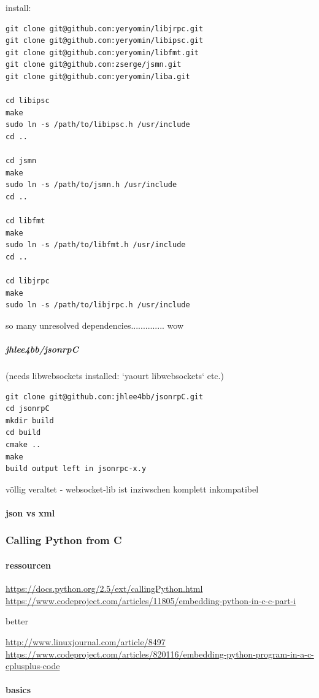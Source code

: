\documentclass[a4paper,10pt]{article}
\begin{document}
install:

\begin{lstlisting}
git clone git@github.com:yeryomin/libjrpc.git
git clone git@github.com:yeryomin/libipsc.git
git clone git@github.com:yeryomin/libfmt.git
git clone git@github.com:zserge/jsmn.git
git clone git@github.com:yeryomin/liba.git

cd libipsc
make
sudo ln -s /path/to/libipsc.h /usr/include
cd ..

cd jsmn
make
sudo ln -s /path/to/jsmn.h /usr/include
cd ..

cd libfmt
make
sudo ln -s /path/to/libfmt.h /usr/include
cd ..

cd libjrpc
make
sudo ln -s /path/to/libjrpc.h /usr/include
\end{lstlisting}

so many unresolved dependencies.............. wow

\subparagraph{jhlee4bb/jsonrpC}

(needs libwebsockets installed: `yaourt libwebsockets` etc.)

\begin{lstlisting}
git clone git@github.com:jhlee4bb/jsonrpC.git
cd jsonrpC
mkdir build
cd build
cmake ..
make
build output left in jsonrpc-x.y
\end{lstlisting}

völlig veraltet - websocket-lib ist inziwschen komplett inkompatibel

\paragraph{json vs xml}

\subsubsection{Calling Python from C}

\paragraph{ressourcen}

\url{https://docs.python.org/2.5/ext/callingPython.html}
\url{https://www.codeproject.com/articles/11805/embedding-python-in-c-c-part-i}

better

\url{http://www.linuxjournal.com/article/8497}
\url{https://www.codeproject.com/articles/820116/embedding-python-program-in-a-c-cplusplus-code}

\paragraph{basics}
\end{document}
